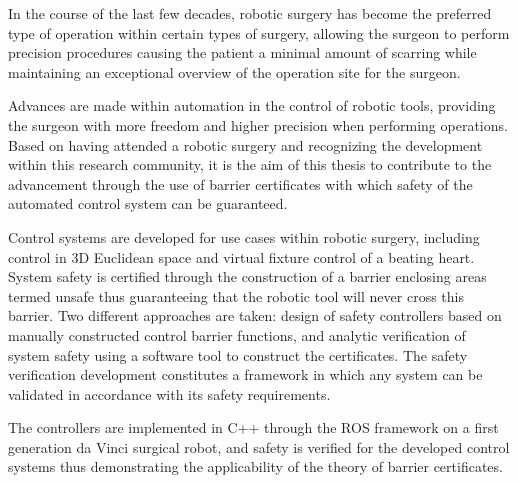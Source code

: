 In the course of the last few decades, robotic sur\-gery has become the  preferred type of operation within certain types of surgery, allowing the surgeon to perform precision procedures causing the patient a minimal amount of scarring while maintaining an exceptional overview of the operation site for the surgeon.


Advances are made within automation in the control of  robotic tools, providing the surgeon with more freedom and higher precision when performing operations. 
Based on having attended a robotic surgery and recognizing the development within this research community, it is the aim of this thesis to contribute to the advancement  through the use of barrier certificates with which safety of the automated control system can be guaranteed.


Control systems are developed for use cases within robotic surgery, including control in 3D Euclidean space and virtual fixture control of a beating heart.
System safety  is certified through the construction of a barrier enclosing areas termed unsafe thus guaranteeing that the robotic tool will never cross this barrier. 
Two different approaches are taken: design of safety controllers based on manually constructed control barrier functions, and analytic verification of system safety using a software tool to construct the certificates.
The safety verification development constitutes a framework in which any system can be  validated in accordance with its safety requirements.


The controllers are implemented in C++ through the ROS framework on a first generation da Vinci surgical robot, and safety is verified for the developed control systems thus demonstrating the applicability of the theory of barrier certificates.



